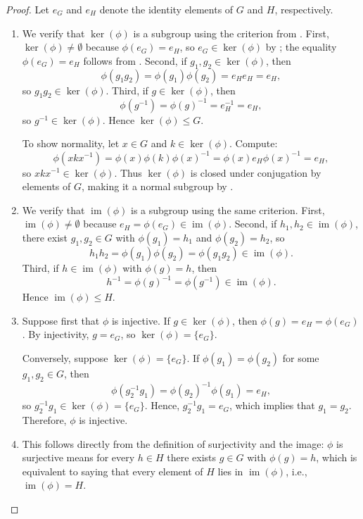 \begin{proof}
    Let $e_G$ and $e_H$ denote the identity elements of $G$ and $H$, respectively.

    \begin{enumerate}
        \item We verify that $\operatorname{ker}(\phi)$ is a subgroup using the criterion from . First, $\operatorname{ker}(\phi) \neq \emptyset$ because $\phi(e_G) = e_H$, so $e_G \in \operatorname{ker}(\phi)$ by ; the equality $\phi(e_G) = e_H$ follows from . Second, if $g_1, g_2 \in \operatorname{ker}(\phi)$, then
        $$\phi(g_1 g_2) = \phi(g_1)\phi(g_2) = e_H e_H = e_H,$$
        so $g_1 g_2 \in \operatorname{ker}(\phi)$. Third, if $g \in \operatorname{ker}(\phi)$, then
        $$\phi(g^{-1}) = \phi(g)^{-1} = e_H^{-1} = e_H,$$
        so $g^{-1} \in \operatorname{ker}(\phi)$. Hence $\operatorname{ker}(\phi) \leq G$.

        To show normality, let $x \in G$ and $k \in \operatorname{ker}(\phi)$. Compute:
        $$\phi(x k x^{-1}) = \phi(x)\phi(k)\phi(x)^{-1} = \phi(x)e_H\phi(x)^{-1} = e_H,$$
        so $x k x^{-1} \in \operatorname{ker}(\phi)$. Thus $\operatorname{ker}(\phi)$ is closed under conjugation by elements of $G$, making it a normal subgroup by .

        \item We verify that $\operatorname{im}(\phi)$ is a subgroup using the same criterion. First, $\operatorname{im}(\phi) \neq \emptyset$ because $e_H = \phi(e_G) \in \operatorname{im}(\phi)$. Second, if $h_1, h_2 \in \operatorname{im}(\phi)$, there exist $g_1, g_2 \in G$ with $\phi(g_1) = h_1$ and $\phi(g_2) = h_2$, so
        $$h_1 h_2 = \phi(g_1)\phi(g_2) = \phi(g_1 g_2) \in \operatorname{im}(\phi).$$
        Third, if $h \in \operatorname{im}(\phi)$ with $\phi(g) = h$, then
        $$h^{-1} = \phi(g)^{-1} = \phi(g^{-1}) \in \operatorname{im}(\phi).$$
        Hence $\operatorname{im}(\phi) \leq H$.

        \item Suppose first that $\phi$ is injective. If $g \in \operatorname{ker}(\phi)$, then $\phi(g) = e_H = \phi(e_G)$. By injectivity, $g = e_G$, so $\operatorname{ker}(\phi) = \{e_G\}$.

        Conversely, suppose $\operatorname{ker}(\phi) = \{e_G\}$. If $\phi(g_1) = \phi(g_2)$ for some $g_1, g_2 \in G$, then
        $$\phi(g_2^{-1} g_1) = \phi(g_2)^{-1}\phi(g_1) = e_H,$$
        so $g_2^{-1} g_1 \in \operatorname{ker}(\phi) = \{e_G\}$. Hence, $g_2^{-1} g_1 = e_G$, which implies that $g_1 = g_2$. Therefore, $\phi$ is injective.

        \item This follows directly from the definition of surjectivity and the image: $\phi$ is surjective means for every $h \in H$ there exists $g \in G$ with $\phi(g) = h$, which is equivalent to saying that every element of $H$ lies in $\operatorname{im}(\phi)$, i.e., $\operatorname{im}(\phi) = H$.
    \end{enumerate}
\end{proof}
